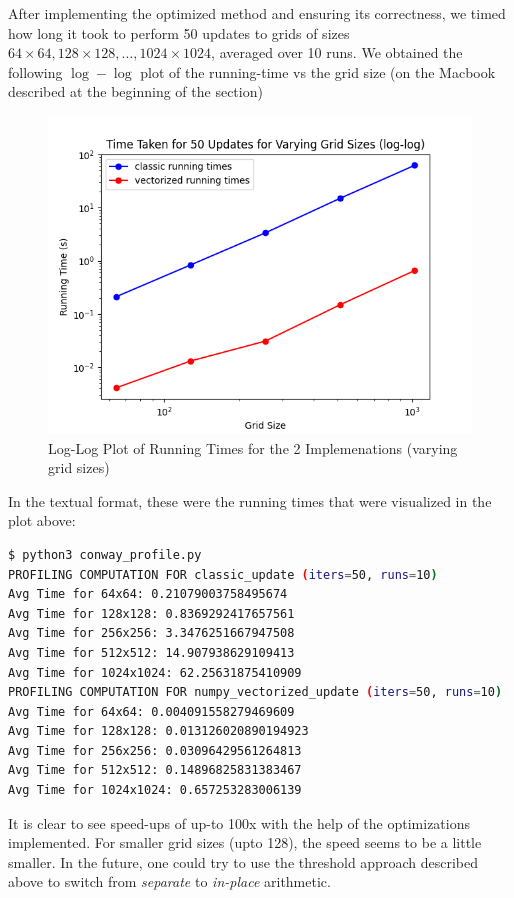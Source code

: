 \documentclass[a4paper,12pt]{article}
\begin{document}
After implementing the optimized method and ensuring its correctness, we timed how long it took to perform 50 updates to grids of sizes $64 \times 64, 128 \times 128, \dots, 1024 \times 1024$, averaged over 10 runs. We obtained the following $\log - \log$ plot of the running-time vs the grid size (on the Macbook described at the beginning of the section)

\begin{figure}[h!]
  \centering
  \includegraphics[width=\textwidth]{images/sub_v_vec_conway.png}
  \caption{Log-Log Plot of Running Times for the 2 Implemenations (varying grid sizes)}
  \label{fig:conway_docs}
\end{figure}

In the textual format, these were the running times that were visualized in the plot above:

\begin{lstlisting}[language=bash,basicstyle=\scriptsize\ttfamily]
$ python3 conway_profile.py
PROFILING COMPUTATION FOR classic_update (iters=50, runs=10)
Avg Time for 64x64: 0.21079003758495674
Avg Time for 128x128: 0.8369292417657561
Avg Time for 256x256: 3.3476251667947508
Avg Time for 512x512: 14.907938629109413
Avg Time for 1024x1024: 62.25631875410909
PROFILING COMPUTATION FOR numpy_vectorized_update (iters=50, runs=10)
Avg Time for 64x64: 0.004091558279469609
Avg Time for 128x128: 0.013126020890194923
Avg Time for 256x256: 0.03096429561264813
Avg Time for 512x512: 0.14896825831383467
Avg Time for 1024x1024: 0.657253283006139
\end{lstlisting}

It is clear to see speed-ups of up-to 100x with the help of the optimizations implemented. For smaller grid sizes (upto 128), the speed seems to be a little smaller. In the future, one could try to use the threshold approach described above to switch from \textit{separate} to \textit{in-place} arithmetic. 
\end{document}
